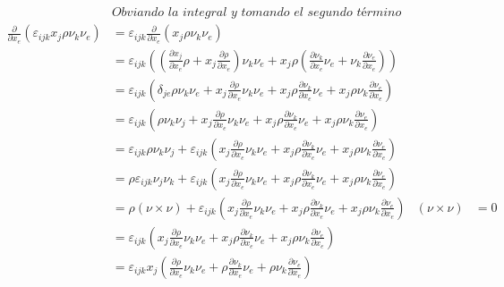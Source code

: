 \documentclass[a4paper,10pt,twoside,final,spanish]{article}
\begin{document}
\begin{align*}
& \textit{Obviando la integral y tomando el segundo término} \\
\frac{\partial}{\partial x_{e}}(\varepsilon_{ijk}x_{j}\rho\nu_{k}\nu_{e})
&= \varepsilon_{ijk}\frac{\partial}{\partial x_{e}}(x_{j}\rho\nu_{k}\nu_{e}) \\
&= \varepsilon_{ijk}\left(\left(\frac{\partial x_{j}}{\partial x_{e}}\rho
+x_{j}\frac{\partial\rho}{\partial x_{e}}\right)\nu_{k}\nu_{e}
+x_{j}\rho\left(\frac{\partial\nu_{k}}{\partial x_{e}}\nu_{e}
+\nu_{k}\frac{\partial\nu_{e}}{\partial x_{e}}\right)\right) \\
&= \varepsilon_{ijk}\left(\delta_{je}\rho\nu_{k}\nu_{e}
+x_{j}\frac{\partial\rho}{\partial x_{e}}\nu_{k}\nu_{e}
+x_{j}\rho\frac{\partial\nu_{k}}{\partial x_{e}}\nu_{e}
+x_{j}\rho\nu_{k}\frac{\partial\nu_{e}}{\partial x_{e}}\right) \\
&= \varepsilon_{ijk}\left(\rho\nu_{k}\nu_{j}
+x_{j}\frac{\partial\rho}{\partial x_{e}}\nu_{k}\nu_{e}
+x_{j}\rho\frac{\partial\nu_{k}}{\partial x_{e}}\nu_{e}
+x_{j}\rho\nu_{k}\frac{\partial\nu_{e}}{\partial x_{e}}\right) \\
&= \varepsilon_{ijk}\rho\nu_{k}\nu_{j}
+\varepsilon_{ijk}\left(x_{j}\frac{\partial\rho}{\partial x_{e}}\nu_{k}\nu_{e}
+x_{j}\rho\frac{\partial\nu_{k}}{\partial x_{e}}\nu_{e}
+x_{j}\rho\nu_{k}\frac{\partial\nu_{e}}{\partial x_{e}}\right) \\
&= \rho\varepsilon_{ijk}\nu_{j}\nu_{k}
+\varepsilon_{ijk}\left(x_{j}\frac{\partial\rho}{\partial x_{e}}\nu_{k}\nu_{e}
+x_{j}\rho\frac{\partial\nu_{k}}{\partial x_{e}}\nu_{e}
+x_{j}\rho\nu_{k}\frac{\partial\nu_{e}}{\partial x_{e}}\right) \\
&= \rho(\nu\times\nu)
+\varepsilon_{ijk}\left(x_{j}\frac{\partial\rho}{\partial x_{e}}\nu_{k}\nu_{e}
+x_{j}\rho\frac{\partial\nu_{k}}{\partial x_{e}}\nu_{e}
+x_{j}\rho\nu_{k}\frac{\partial\nu_{e}}{\partial x_{e}}\right)
& (\nu\times\nu) &= 0 \\
&= \varepsilon_{ijk}\left(x_{j}\frac{\partial\rho}{\partial x_{e}}\nu_{k}\nu_{e}
+x_{j}\rho\frac{\partial\nu_{k}}{\partial x_{e}}\nu_{e}
+x_{j}\rho\nu_{k}\frac{\partial\nu_{e}}{\partial x_{e}}\right) \\
&= \varepsilon_{ijk}x_{j}\left(\frac{\partial\rho}{\partial x_{e}}\nu_{k}\nu_{e}
+\rho\frac{\partial\nu_{k}}{\partial x_{e}}\nu_{e}
+\rho\nu_{k}\frac{\partial\nu_{e}}{\partial x_{e}}\right)
\end{align*}
\end{document}
